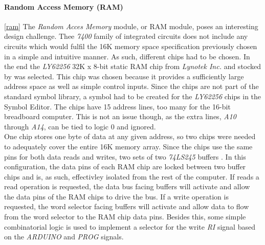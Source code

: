 \paragraph{Random Access Memory (RAM)} \ref{ram}
The \emph{Random Acces Memory} module, or RAM module, poses an interesting design challenge. Thee \emph{7400} family of integrated
circuits does not include any circuits which would fulfil the 16K memory space specification previously chosen in a simple and
intuitive manner. As such, different chips had to be chosen. In the end the \emph{LY62256} 32K x 8-bit static RAM chip
\cite{ly62256} from \emph{Lynotek Inc.} and stocked by \cite{farnell} was selected. This chip was chosen because it provides
a sufficiently large address space as well as simple control inputs. Since the chips are not part of the standard symbol library,
a symbol had to be created for the \emph{LY62256} chips in the Symbol Editor. The chips have 15 address lines, too many for the
16-bit breadboard computer. This is not an issue though, as the extra lines, \emph{A10} through \emph{A14}, can be tied to logic
0 and ignored. \\
One chip stores one byte of data at any given address, so two chips were needed to adequately cover the entire 16K memory array.
Since the chips use the same pins for both data reads and writes, two sets of two \emph{74LS245} buffers \cite{74ls245}. In this
configuration, the data pins of each RAM chip are locked between two buffer chips and is, as such, effectivley isolated from the
rest of the computer. If reads a read operation is requested, the data bus facing buffers will activate and allow the data pins of
the RAM chips to drive the bus. If a write operation is requested, the word selector facing buffers will activate and allow data to
flow from the word selector to the RAM chip data pins. Besides this, some simple combinatorial logic is used to implement a selector
for the write \emph{RI} signal based on the \emph{ARDUINO} and \emph{PROG} signals.



